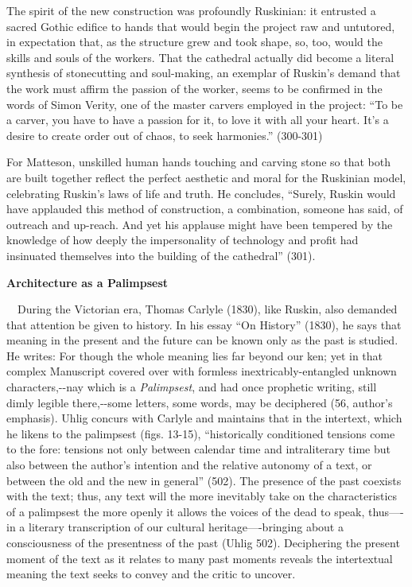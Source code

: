 {\color{black}
The spirit of the new construction was profoundly Ruskinian: it
entrusted a sacred Gothic edifice to hands that would begin the project
raw and untutored, in expectation that, as the structure grew and took
shape, so, too, would the skills and souls of the workers.  That the
cathedral actually did become a literal synthesis of stonecutting and
soul-making, an exemplar of Ruskin’s demand that the work must affirm
the passion of the worker, seems to be confirmed in the words of Simon
Verity, one of the master carvers employed in the project: “To be a
carver, you have to have a passion for it, to love it with all your
heart.  It’s a desire to create order out of chaos, to seek harmonies.”
 (300-301) }

{\color{black}
For Matteson, unskilled human hands touching and carving stone so that
both are built together reflect the perfect aesthetic and moral for the
Ruskinian model, celebrating Ruskin’s laws of life and truth.  He
concludes, “Surely, Ruskin would have applauded this method of
construction, a combination, someone has said, of outreach and
up-reach.  And yet his applause might have been tempered by the
knowledge of how deeply the impersonality of technology and profit had
insinuated themselves into the building of the cathedral” (301).  }


\bigskip


\bigskip

{\centering\color{black}
\textbf{Architecture as a Palimpsest}
\par}

{\color{black}
 \ \ During the Victorian era, Thomas Carlyle (1830), like Ruskin, also
demanded that attention be given to history.  In his essay “On History”
(1830), he says that meaning in the present and the future can be known
only as the past is studied.  He writes: {\textquotedbl}For though the
whole meaning lies far beyond our ken; yet in that complex Manuscript
covered over with formless inextricably-entangled unknown
characters,-{}-nay which is a \textit{Palimpsest}, and had once
prophetic writing, still dimly legible there,-{}-some letters, some
words, may be deciphered{\textquotedbl} (56, author’s emphasis).  Uhlig
concurs with Carlyle and maintains that in the intertext, which he
likens to the palimpsest (figs. 13-15), “historically conditioned
tensions come to the fore: tensions not only between calendar time and
intraliterary time but also between the author’s intention and the
relative autonomy of a text, or between the old and the new in general”
(502).  The presence of the past coexists with the text; thus,
{\textquotedbl}any text will the more inevitably take on the
characteristics of a palimpsest the more openly it allows the voices of
the dead to speak, thus—-in a literary transcription of our cultural
heritage—-bringing about a consciousness of the presentness of the
past{\textquotedbl} (Uhlig 502).  Deciphering the present moment of the
text as it relates to many past moments reveals the intertextual
meaning the text seeks to convey and the critic to uncover.  }

